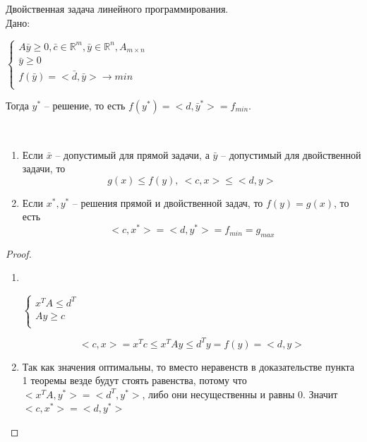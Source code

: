 Двойственная задача линейного программирования.\\
Дано:
\begin{center}
    $
    \left\{
    \begin{array}{lcl}
    A\bar y\geqslant 0, \bar c\in \mathbb{R}^m, \bar y \in \mathbb{R}^n, A_{m\times n}\\
    \bar y \geqslant 0\\
    f(\bar y)=<\bar d, \bar y> \to min\\
    \end{array}
    \right.
    $
\end{center}
Тогда $y^*$ -- решение, то есть $f(y^*)=<d, \bar y^*>=f_{min}$.
\begin{theorem}
    \ 
\begin{enumerate}
    \item Если $\bar x$ -- допустимый для прямой задачи, а $\bar y$ -- допустимый для двойственной задачи, то $$g(x)\leqslant f(y), ~<c, x>\leqslant <d, y>$$
    \item Если $x^*, y^*$ -- решения прямой и двойственной задач, то $f(y)=g(x)$, то есть $$<c, x^*>=<d, y^*>=f_{min}=g_{max}$$
\end{enumerate}
\end{theorem}
\begin{proof}\ 
    \begin{enumerate}
        \item \ 
        \begin{center}    
        $
        \left\{
        \begin{array}{lcl}
        x^TA \leqslant d^T\\
        Ay\geqslant c\\
        \end{array}
        \right.
        $
        \end{center}
        $$<c, x>=x^Tc\leqslant x^TAy \leqslant d^Ty=f(y)=<d, y>$$
        \item 
        Так как значения оптимальны, то вместо неравенств в доказательстве пункта 1 теоремы везде будут стоять равенства, потому что $<x^TA, y^*>=<d^T, y^*>$, либо они несущественны и равны 0. Значит $<c, x^*>=<d, y^*>$
    \end{enumerate}
\end{proof}